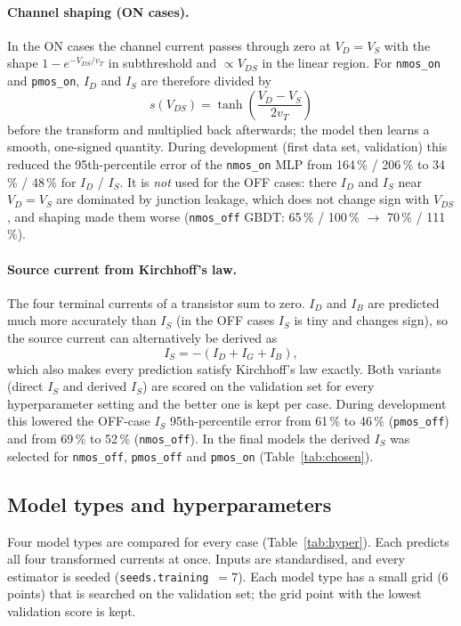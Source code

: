 \paragraph{Channel shaping (ON cases).}
In the ON cases the channel current passes through zero at $V_D=V_S$ with the shape
$1-e^{-V_{DS}/v_T}$ in subthreshold and $\propto V_{DS}$ in the linear region. For
\texttt{nmos\_on} and \texttt{pmos\_on}, $I_D$ and $I_S$ are therefore divided by
\begin{equation}
  s(V_{DS}) = \tanh\!\left(\frac{V_D - V_S}{2 v_T}\right)
\end{equation}
before the transform and multiplied back afterwards; the model then learns a smooth,
one-signed quantity. During development (first data set, validation) this reduced the
95th-percentile error of the \texttt{nmos\_on} MLP from 164\,\% / 206\,\% to 34\,\% / 48\,\%
for $I_D$ / $I_S$. It is \emph{not} used for the OFF cases: there $I_D$ and $I_S$ near
$V_D=V_S$ are dominated by junction leakage, which does not change sign with $V_{DS}$, and
shaping made them worse (\texttt{nmos\_off} GBDT: 65\,\% / 100\,\% $\rightarrow$
70\,\% / 111\,\%).

\paragraph{Source current from Kirchhoff's law.}
The four terminal currents of a transistor sum to zero. $I_D$ and $I_B$ are predicted much
more accurately than $I_S$ (in the OFF cases $I_S$ is tiny and changes sign), so the source
current can alternatively be derived as
\begin{equation}
  I_S = -(I_D + I_G + I_B),
\end{equation}
which also makes every prediction satisfy Kirchhoff's law exactly. Both variants (direct
$I_S$ and derived $I_S$) are scored on the validation set for every hyperparameter setting and
the better one is kept per case. During development this lowered the OFF-case $I_S$
95th-percentile error from 61\,\% to 46\,\% (\texttt{pmos\_off}) and from 69\,\% to 52\,\%
(\texttt{nmos\_off}). In the final models the derived $I_S$ was selected for
\texttt{nmos\_off}, \texttt{pmos\_off} and \texttt{pmos\_on} (Table~\ref{tab:chosen}).

\subsection{Model types and hyperparameters}
Four model types are compared for every case (Table~\ref{tab:hyper}). Each predicts all four
transformed currents at once. Inputs are standardised, and every estimator is seeded
(\texttt{seeds.training}~$=7$). Each model type has a small grid (6 points) that is searched
on the validation set; the grid point with the lowest validation score is kept.

